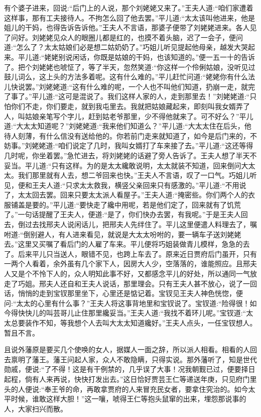 \begin{parag}
    有个婆子进来，回说:“后门上的人说，那个刘姥姥又来了。”王夫人道:“咱们家遭着这样事，那有工夫接待人。不拘怎么回了他去罢。”平儿道:“太太该叫他进来，他是姐儿的干妈，也得告诉告诉他。”王夫人不言语，那婆子便带了刘姥姥进来。各人见了问好。刘姥姥见众人的眼圈儿都是红的，也摸不着头脑，迟了一会子，便问道:“怎么了？太太姑娘们必是想二姑奶奶了。”巧姐儿听见提起他母亲，越发大哭起来。平儿道:“姥姥别说闲话，你既是姑娘的干妈，也该知道的。”便一五一十的告诉了。把个刘姥姥也唬怔了，等了半天，忽然笑道:“你这样一个伶俐姑娘，没听见过鼓儿词么，这上头的方法多着呢。这有什么难的。”平儿赶忙问道:“姥姥你有什么法儿快说罢。”刘姥姥道:“这有什么难的呢，一个人也不叫他们知道，扔崩一走，就完了事了。”平儿道:“这可是混说了。我们这样人家的人，走到那里去！”刘姥姥道:“只怕你们不走，你们要走，就到我屯里去。我就把姑娘藏起来，即刻叫我女婿弄了人，叫姑娘亲笔写个字儿，赶到姑老爷那里，少不得他就来了。可不好么？”平儿道:“大太太知道呢？”刘姥姥道:“我来他们知道么？”平儿道:“大太太住在后头，他待人刻薄，有什么信没有送给他的。你若前门走来就知道了，如今是后门来的，不妨事。”刘姥姥道:“咱们说定了几时，我叫女婿打了车来接了去。”平儿道:“这还等得几时呢，你坐着罢。”急忙进去，将刘姥姥的话避了旁人告诉了。王夫人想了半天不妥当。平儿道:“只有这样。为的是太太纔敢说明，太太就装不知道，回来倒问大太太。我们那里就有人去，想二爷回来也快。”王夫人不言语，叹了一口气。巧姐儿听见，便和王夫人道:“只求太太救我，横竖父亲回来只有感激的。”平儿道:“不用说了，太太回去罢。回来只要太太派人看屋子。”王夫人道:“掩密些。你们两个人的衣服铺盖是要的。”平儿道:“要快走了纔中用呢，若是他们定了，回来就有了饥荒了。”一句话提醒了王夫人，便道:“是了，你们快办去罢，有我呢。”于是王夫人回去，倒过去找邢夫人说闲话儿，把邢夫人先绊住了。平儿这里便遣人料理去了，嘱咐道:“倒别避人，有人进来看见，就说是大太太吩咐的，要一辆车子送刘姥姥去。”这里又买嘱了看后门的人雇了车来。平儿便将巧姐装做青儿模样，急急的去了。后来平儿只当送人，眼错不见，也跨上车去了。原来近日贾府后门虽开，只有一两个人看着，余外虽有几个家下人，因房大人少，空落落的，谁能照应。且邢夫人又是个不怜下人的，众人明知此事不好，又都感念平儿的好处，所以通同一气放走了巧姐。邢夫人还自和王夫人说话，那里理会。只有王夫人甚不放心，说了一回话，悄悄的走到宝钗那里坐下，心里还是惦记着。宝钗见王夫人神色恍惚，便问:“太太的心里有什么事？”王夫人将这事背地里和宝钗说了。宝钗道:“险得很！如今得快快儿的叫芸哥儿止住那里纔妥当。”王夫人道:“我找不着环儿呢。”宝钗道:“太太总要装作不知，等我想个人去叫大太太知道纔好。”王夫人点头，一任宝钗想人。暂且不言。
\end{parag}


\begin{parag}
    且说外藩原是要买几个使唤的女人，据媒人一面之辞，所以派人相看。相看的人回去禀明了藩王。藩王问起人家，众人不敢隐瞒，只得实说。那外藩听了，知是世代勋戚，便说:“了不得！这是有干例禁的，几乎误了大事！况我朝觐已过，便要择日起程，倘有人来再说，快快打发出去。”这日恰好贾芸王仁等递送年庚，只见府门里头的人便说:“奉王爷的命，再敢拿贾府的人来冒充民女者，要拿住究治的。如今太平时候，谁敢这样大胆！”这一嚷，唬得王仁等抱头鼠窜的出来，埋怨那说事的人，大家扫兴而散。
\end{parag}


